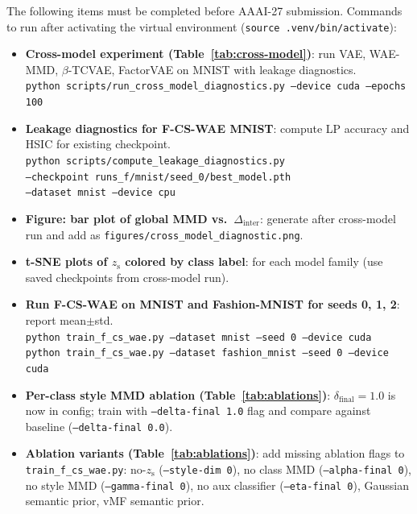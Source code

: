 \documentclass[10pt]{article}
\newcommand{\ours}{F-CS-WAE}
\newcommand{\zs}{z_{\mathrm{s}}}
\begin{document}
The following items must be completed before AAAI-27 submission.
Commands to run after activating the virtual environment (\texttt{source .venv/bin/activate}):

\begin{itemize}
  \item \textbf{Cross-model experiment (Table~\ref{tab:cross-model})}:
        run VAE, WAE-MMD, $\beta$-TCVAE, FactorVAE on MNIST with leakage diagnostics.\\
        \texttt{python scripts/run\_cross\_model\_diagnostics.py --device cuda --epochs 100}

  \item \textbf{Leakage diagnostics for \ours{} MNIST}:
        compute LP accuracy and HSIC for existing checkpoint.\\
        \texttt{python scripts/compute\_leakage\_diagnostics.py} \\
        \texttt{\quad --checkpoint runs\_f/mnist/seed\_0/best\_model.pth} \\
        \texttt{\quad --dataset mnist --device cpu}

  \item \textbf{Figure: bar plot of global MMD vs.\ $\Delta_{\mathrm{inter}}$}:
        generate after cross-model run and add as \texttt{figures/cross\_model\_diagnostic.png}.

  \item \textbf{t-SNE plots of $\zs$ colored by class label}:
        for each model family (use saved checkpoints from cross-model run).

  \item \textbf{Run \ours{} on MNIST and Fashion-MNIST for seeds 0, 1, 2}:
        report mean$\pm$std.\\
        \texttt{python train\_f\_cs\_wae.py --dataset mnist --seed 0 --device cuda}\\
        \texttt{python train\_f\_cs\_wae.py --dataset fashion\_mnist --seed 0 --device cuda}

  \item \textbf{Per-class style MMD ablation (Table~\ref{tab:ablations})}:
        $\delta_{\mathrm{final}}=1.0$ is now in config; train with
        \texttt{--delta-final 1.0} flag and compare against baseline
        (\texttt{--delta-final 0.0}).

  \item \textbf{Ablation variants (Table~\ref{tab:ablations})}:
        add missing ablation flags to \texttt{train\_f\_cs\_wae.py}:
        no-$\zs$ (\texttt{--style-dim 0}),
        no class MMD (\texttt{--alpha-final 0}),
        no style MMD (\texttt{--gamma-final 0}),
        no aux classifier (\texttt{--eta-final 0}),
        Gaussian semantic prior, vMF semantic prior.


\end{itemize}
\end{document}
